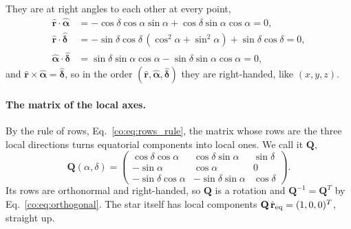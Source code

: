 They are at right angles to each other at every point,
\begin{align}
	\hat{\mathbf r}\cdot\hat{\boldsymbol\alpha} &= -\cos\delta\cos\alpha\sin\alpha+\cos\delta\sin\alpha\cos\alpha = 0, \nonumber\\
	\hat{\mathbf r}\cdot\hat{\boldsymbol\delta} &= -\sin\delta\cos\delta\,(\cos^2\alpha+\sin^2\alpha)+\sin\delta\cos\delta = 0, \nonumber\\
	\hat{\boldsymbol\alpha}\cdot\hat{\boldsymbol\delta} &= \sin\delta\sin\alpha\cos\alpha-\sin\delta\sin\alpha\cos\alpha = 0,
\end{align}
and $\hat{\mathbf r}\times\hat{\boldsymbol\alpha}=\hat{\boldsymbol\delta}$, so in the order $(\hat{\mathbf r},\hat{\boldsymbol\alpha},\hat{\boldsymbol\delta})$ they are right-handed, like $(x,y,z)$.

\paragraph{The matrix of the local axes.} By the rule of rows, Eq.~\eqref{co:eq:rows_rule}, the matrix whose rows are the three local directions turns equatorial components into local ones. We call it $\mathbf Q$,
\begin{equation}
	\mathbf Q(\alpha,\delta) = \begin{pmatrix} \cos\delta\cos\alpha & \cos\delta\sin\alpha & \sin\delta \\ -\sin\alpha & \cos\alpha & 0 \\ -\sin\delta\cos\alpha & -\sin\delta\sin\alpha & \cos\delta \end{pmatrix}.
	\label{as:eq:Q}
\end{equation}
Its rows are orthonormal and right-handed, so $\mathbf Q$ is a rotation and $\mathbf Q^{-1}=\mathbf Q^{T}$ by Eq.~\eqref{co:eq:orthogonal}. The star itself has local components $\mathbf Q\,\hat{\mathbf r}_{\rm eq}=(1,0,0)^T$, straight up.

